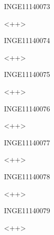 \documentclass{article}
\begin{document}
\begin{corrige}{INGE11140073}

<++>

\end{corrige}%


\begin{corrige}{INGE11140074}

<++>

\end{corrige}%


\begin{corrige}{INGE11140075}

<++>

\end{corrige}%


\begin{corrige}{INGE11140076}

<++>

\end{corrige}%


\begin{corrige}{INGE11140077}

<++>

\end{corrige}%


\begin{corrige}{INGE11140078}

<++>

\end{corrige}%


\begin{corrige}{INGE11140079}

<++>

\end{corrige}%
\end{document}
